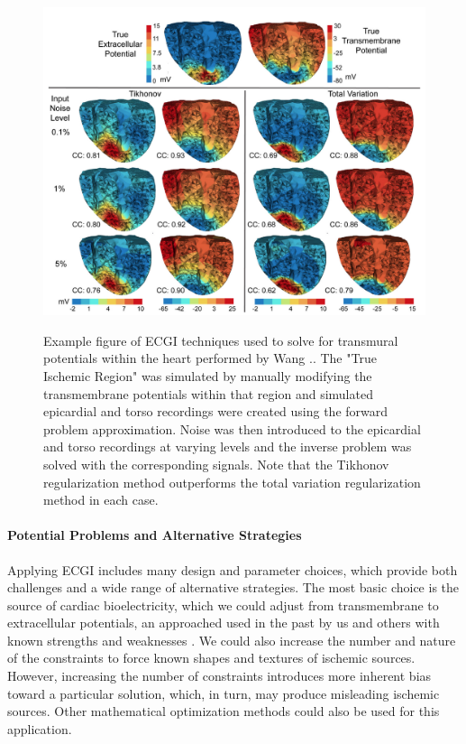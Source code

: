 \begin{figure}[htb]%
	\begin{center}
		{\includegraphics[width=\textwidth]
			{../Figures/wangVolume.png}}
		\captionsetup{width = \textwidth}
		\caption{\small \label{fig:wang} Example figure of ECGI techniques used to solve for transmural potentials within the heart performed by Wang \etal.\cite{RSM:Wan2013}. The "True Ischemic Region" was simulated by manually modifying the transmembrane potentials within that region and simulated epicardial and torso recordings were created using the forward problem approximation. Noise was then introduced to the epicardial and torso recordings at varying levels and the inverse problem was solved with the corresponding signals. Note that the Tikhonov regularization method outperforms the total variation regularization method in each case. }
	\end{center}
\end{figure}
\paragraph{Potential Problems and Alternative Strategies} Applying ECGI
includes many design and parameter choices, which provide both challenges
and a wide range of alternative strategies. The most basic choice is the
source of cardiac bioelectricity, which we could adjust from transmembrane
to extracellular potentials, an approached used in the past by us and
others with known strengths and weaknesses \cite{RSM:Mac95,RSM:Ost97b}. We
could also increase the number and nature of the constraints to force known
shapes and textures of ischemic sources. However, increasing the number of
constraints introduces more inherent bias toward a particular solution,
which, in turn, may produce misleading ischemic sources. Other mathematical
optimization methods could also be used for this
application\cite{RSM:Ahm94,RSM:Bro96b,RSM:Ahm98,
  RSM:Gha2001,RSM:Ost92,RSM:Ost97c,RSM:Ram2003,RSM:Clu2018}.

